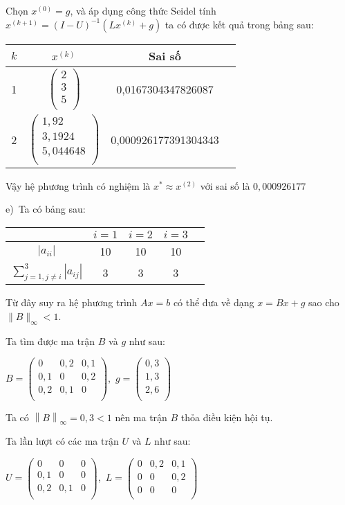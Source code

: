Chọn $x^{(0)}=g$, và áp dụng công thức Seidel tính $x^{(k+1)}=(I-U)^{-1}(Lx^{(k)}+g)$ ta có được kết quả trong bảng sau:
\begin{longtable}{|c|Sc|c|}\hline
$k$&$x^{(k)}$&Sai số\\&$\begin{pmatrix}2\\3\\5\\\end{pmatrix}$&0,0167304347826087\\&$\begin{pmatrix}1,92\\3,1924\\5,044648\\\end{pmatrix}$&0,000926177391304343\\\hline
\end{longtable}
Vậy hệ phương trình có nghiệm là $x^*\approx x^{(2)}$ với sai số là $0,000926177$
\par

e)~Ta có bảng sau:
\begin{longtable}{|Sc|c|c|c|}\hline
&$i=1$&$i=2$&$i=3$\\\hline
\endhead
$\left|a_{ii}\right|$&10&10&10\\\hline
$\sum\limits_{j=1,j\neq i}^{3} \left|a_{ij}\right|$&3&3&3\\\hline
\end{longtable}

Từ đây suy ra hệ phương trình $Ax=b$ có thể đưa về dạng $x=Bx+g$ sao cho $\|B\|_{\infty} <1$.\par

Ta tìm được ma trận $B$ và $g$ như sau:\par
$B= \begin{pmatrix}
0&0,2&0,1\\
0,1&0&0,2\\
0,2&0,1&0\\
\end{pmatrix}$,~$g=\begin{pmatrix}
0,3\\
1,3\\
2,6\\
\end{pmatrix}$

Ta có $\left\|B\right\|_{\infty}=0,3<1 $ nên ma trận $B$ thỏa điều kiện hội tụ.\par
Ta lần lượt có các ma trận $U$ và $L$ như sau:\par
$U=\begin{pmatrix}
0&0&0\\
0,1&0&0\\
0,2&0,1&0\\
\end{pmatrix}$,~$L=\begin{pmatrix}
0&0,2&0,1\\
0&0&0,2\\
0&0&0\\
\end{pmatrix}$


